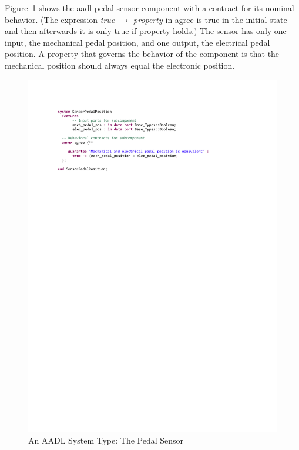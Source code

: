 Figure~\ref{fig:sensor} shows the \gls{aadl} pedal sensor component with a contract for its nominal behavior. (The expression \textit{true $\rightarrow$ property} in \gls{agree} is true in the initial state and then afterwards it is only true if property holds.) The sensor has only one input, the mechanical pedal position, and one output, the electrical pedal position. 
A property that governs the behavior of the component is that the mechanical position should always equal the electronic position. 

\begin{figure}[h!]
	\hspace*{-2cm}
	\begin{center}
		\includegraphics[trim=0 640 -10 70,clip,width=1.5\dimexpr\textwidth-2cm\relax]{images/system_sensor.pdf}
		\vspace{-0.3in}
		\caption{An AADL System Type: The Pedal Sensor}
		\label{fig:sensor}
	\end{center}
	\vspace{-0.2in}
\end{figure}

